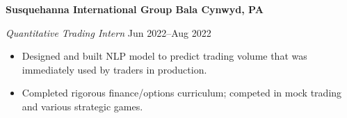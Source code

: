 \textbf{Susquehanna International Group \hfill Bala Cynwyd, PA}\par

\textit{Quantitative Trading Intern} \hfill Jun 2022--Aug 2022
\begin{itemize}
	\item Designed and built NLP model to predict trading volume that was immediately used by traders in production.
	\item Completed rigorous finance/options curriculum; competed in mock trading and various strategic games.
\end{itemize} \par